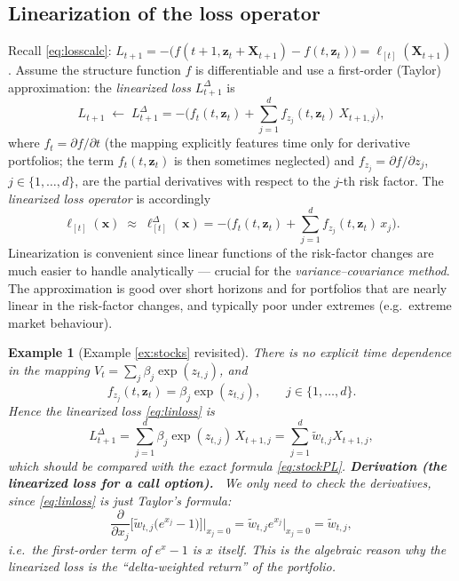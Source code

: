 \documentclass[11pt,a4paper]{article}
\newtheorem{example}{Example}
\newcommand{\der}[1]{\medskip\noindent\textbf{Derivation (#1).}\ }
\begin{document}
\subsection{Linearization of the loss operator}
Recall \eqref{eq:losscalc}: $L_{t+1}= -\big(f(t+1,\mathbf{z}_t+\mathbf{X}_{t+1})-f(t,\mathbf{z}_t)\big)
=\ell_{[t]}(\mathbf{X}_{t+1})$. Assume the structure function $f$ is differentiable and use a
first-order (Taylor) approximation: the \emph{linearized loss} $L^{\Delta}_{t+1}$ is
\begin{equation}\label{eq:linloss}
  L_{t+1}\;\leftarrow\;L^{\Delta}_{t+1}
   =-\Big(f_t(t,\mathbf{z}_t)+\sum_{j=1}^d f_{z_j}(t,\mathbf{z}_t)\,X_{t+1,j}\Big),
\end{equation}
where $f_t=\partial f/\partial t$ (the mapping explicitly features time only for derivative
portfolios; the term $f_t(t,\mathbf{z}_t)$ is then sometimes neglected) and
$f_{z_j}=\partial f/\partial z_j$, $j\in\{1,\dots,d\}$, are the partial derivatives with respect to
the $j$-th risk factor. The \emph{linearized loss operator} is accordingly
\begin{equation}\label{eq:linlossop}
  \ell_{[t]}(\mathbf{x})\;\approx\;\ell^{\Delta}_{[t]}(\mathbf{x})
   =-\Big(f_t(t,\mathbf{z}_t)+\sum_{j=1}^d f_{z_j}(t,\mathbf{z}_t)\,x_j\Big).
\end{equation}
Linearization is convenient since linear functions of the risk-factor changes are much easier to
handle analytically --- crucial for the \emph{variance--covariance method}. The approximation is
good over short horizons and for portfolios that are nearly linear in the risk-factor changes, and
typically poor under extremes (e.g.\ extreme market behaviour).

\begin{example}[Example \ref{ex:stocks} revisited]
There is no explicit time dependence in the mapping $V_t=\sum_j\beta_j\exp(z_{t,j})$, and
\[
  f_{z_j}(t,\mathbf{z}_t)=\beta_j\exp(z_{t,j}),\qquad j\in\{1,\dots,d\}.
\]
Hence the linearized loss \eqref{eq:linloss} is
\[
  L^{\Delta}_{t+1}=\sum_{j=1}^d \beta_j \exp(z_{t,j})\,X_{t+1,j}
                  =\sum_{j=1}^d \tilde w_{t,j} X_{t+1,j},
\]
which should be compared with the exact formula \eqref{eq:stockPL}.
\der{the linearized loss for a call option}
We only need to check the derivatives, since \eqref{eq:linloss} is just Taylor's formula:
\[
  \frac{\partial}{\partial x_j}\Big[\tilde w_{t,j}\big(e^{x_j}-1\big)\Big]\Big|_{x_j=0}
  =\tilde w_{t,j}e^{x_j}\big|_{x_j=0}=\tilde w_{t,j},
\]
i.e.\ the first-order term of $e^{x}-1$ is $x$ itself. This is the algebraic reason why the
linearized loss is the ``delta-weighted return'' of the portfolio.
\end{example}
\end{document}
